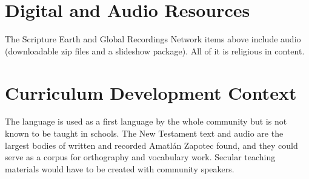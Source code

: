\documentclass[12pt]{article}
\begin{document}
\section{Digital and Audio Resources}
The Scripture Earth and Global Recordings Network items above include audio (downloadable zip files and a slideshow package). All of it is religious in content.

\section{Curriculum Development Context}
The language is used as a first language by the whole community but is not known to be taught in schools. The New Testament text and audio are the largest bodies of written and recorded Amatl\'an Zapotec found, and they could serve as a corpus for orthography and vocabulary work. Secular teaching materials would have to be created with community speakers.
\end{document}
